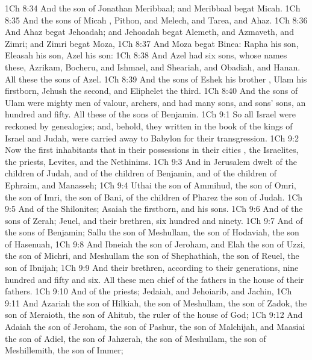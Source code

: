 \vs 1Ch 8:34 And the son of Jonathan  Meribbaal; and Meribbaal begat Micah.
\vs 1Ch 8:35 And the sons of Micah , Pithon, and Melech, and Tarea, and Ahaz.
\vs 1Ch 8:36 And Ahaz begat Jehoadah; and Jehoadah begat Alemeth, and Azmaveth, and Zimri; and Zimri begat Moza,
\vs 1Ch 8:37 And Moza begat Binea: Rapha  his son, Eleasah his son, Azel his son:
\vs 1Ch 8:38 And Azel had six sons, whose names  these, Azrikam, Bocheru, and Ishmael, and Sheariah, and Obadiah, and Hanan. All these  the sons of Azel.
\vs 1Ch 8:39 And the sons of Eshek his brother , Ulam his firstborn, Jehush the second, and Eliphelet the third.
\vs 1Ch 8:40 And the sons of Ulam were mighty men of valour, archers, and had many sons, and sons' sons, an hundred and fifty. All these  of the sons of Benjamin.
\vs 1Ch 9:1 So all Israel were reckoned by genealogies; and, behold, they  written in the book of the kings of Israel and Judah,  were carried away to Babylon for their transgression.
\vs 1Ch 9:2 Now the first inhabitants that  in their possessions in their cities , the Israelites, the priests, Levites, and the Nethinims.
\vs 1Ch 9:3 And in Jerusalem dwelt of the children of Judah, and of the children of Benjamin, and of the children of Ephraim, and Manasseh;
\vs 1Ch 9:4 Uthai the son of Ammihud, the son of Omri, the son of Imri, the son of Bani, of the children of Pharez the son of Judah.
\vs 1Ch 9:5 And of the Shilonites; Asaiah the firstborn, and his sons.
\vs 1Ch 9:6 And of the sons of Zerah; Jeuel, and their brethren, six hundred and ninety.
\vs 1Ch 9:7 And of the sons of Benjamin; Sallu the son of Meshullam, the son of Hodaviah, the son of Hasenuah,
\vs 1Ch 9:8 And Ibneiah the son of Jeroham, and Elah the son of Uzzi, the son of Michri, and Meshullam the son of Shephathiah, the son of Reuel, the son of Ibnijah;
\vs 1Ch 9:9 And their brethren, according to their generations, nine hundred and fifty and six. All these men  chief of the fathers in the house of their fathers.
\vs 1Ch 9:10 And of the priests; Jedaiah, and Jehoiarib, and Jachin,
\vs 1Ch 9:11 And Azariah the son of Hilkiah, the son of Meshullam, the son of Zadok, the son of Meraioth, the son of Ahitub, the ruler of the house of God;
\vs 1Ch 9:12 And Adaiah the son of Jeroham, the son of Pashur, the son of Malchijah, and Maasiai the son of Adiel, the son of Jahzerah, the son of Meshullam, the son of Meshillemith, the son of Immer;
